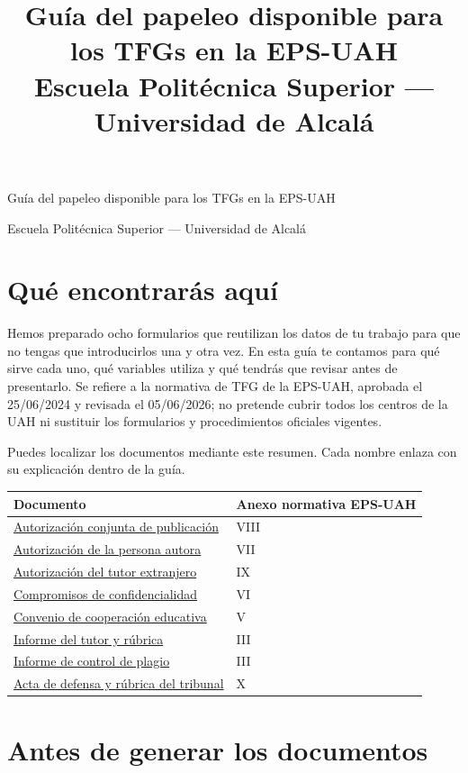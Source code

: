 \documentclass[10pt,a4paper]{article}
\title{Guía del papeleo disponible para los TFGs en la EPS-UAH\\\large Escuela Politécnica Superior --- Universidad de Alcalá}
\author{}
\date{}
\begin{document}
\begin{center}
{\LARGE Guía del papeleo disponible para los TFGs en la EPS-UAH\par}
\medskip
{\large Escuela Politécnica Superior --- Universidad de Alcalá\par}
\end{center}

{\small
\setlength{\parskip}{0pt}
\tableofcontents
}
\medskip

\section{Qué encontrarás aquí}

Hemos preparado ocho formularios que reutilizan los datos de tu trabajo para que no tengas que introducirlos una y otra vez. En esta guía te contamos para qué sirve cada uno, qué variables utiliza y qué tendrás que revisar antes de presentarlo. Se refiere a la normativa de TFG de la EPS-UAH, aprobada el 25/06/2024 y revisada el 05/06/2026; no pretende cubrir todos los centros de la UAH ni sustituir los formularios y procedimientos oficiales vigentes.

Puedes localizar los documentos mediante este resumen. Cada nombre enlaza con su explicación dentro de la guía.

\medskip
\begin{tabularx}{\textwidth}{@{}Xl@{}}
\toprule
Documento & Anexo normativa EPS-UAH \\
\midrule
\hyperref[form:conjunta]{Autorización conjunta de publicación} & VIII \\
\hyperref[form:autor]{Autorización de la persona autora} & VII \\
\hyperref[form:extranjero]{Autorización del tutor extranjero} & IX \\
\hyperref[form:confidencialidad]{Compromisos de confidencialidad} & VI \\
\hyperref[form:convenio]{Convenio de cooperación educativa} & V \\
\hyperref[form:informe]{Informe del tutor y rúbrica} & III \\
\hyperref[form:plagio]{Informe de control de plagio} & III \\
\hyperref[form:acta]{Acta de defensa y rúbrica del tribunal} & X \\
\bottomrule
\end{tabularx}

\section{Antes de generar los documentos}
\end{document}
